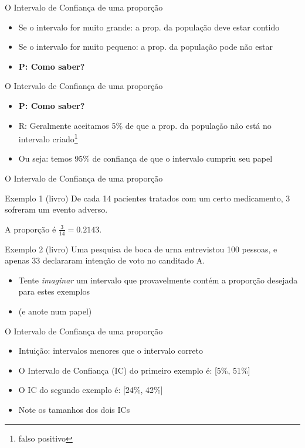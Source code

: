 \documentclass{beamer}
\begin{document}
\begin{frame}{O Intervalo de Confiança de uma proporção}
  \begin{itemize}
  \item Se o intervalo for muito grande: a prop. da população deve estar contido
  \item Se o intervalo for muito pequeno: a prop. da população pode não estar
  \item {\bf P: Como saber?}
  \end{itemize}
\end{frame}

\begin{frame}{O Intervalo de Confiança de uma proporção}
  \begin{itemize}
  \item {\bf P: Como saber?}
  \item R: Geralmente aceitamos 5\% de que a prop. da população não está no intervalo criado\footnote{\scriptsize falso positivo}
  \item Ou seja: temos \alert{95\% de confiança} de que o intervalo cumpriu seu papel
  \end{itemize}
\end{frame}

\begin{frame}{O Intervalo de Confiança de uma proporção}
  \begin{exampleblock}{Exemplo 1 (livro)}
    De cada 14 pacientes tratados com um certo medicamento, 3 sofreram um evento adverso.

    A proporção é $\frac{3}{14} = 0.2143$.
  \end{exampleblock}
    \begin{exampleblock}{Exemplo 2 (livro)}
    Uma pesquisa de boca de urna entrevistou 100 pessoas, e apenas 33 declararam intenção de voto no canditado A.

  \end{exampleblock}
  \begin{itemize}
    \item Tente {\em imaginar} um intervalo que \alert{provavelmente contém} a proporção desejada para estes exemplos
    \item (e anote num papel)
  \end{itemize}
\end{frame}

\begin{frame}{O Intervalo de Confiança de uma proporção}
  \begin{itemize}
  \item Intuição: intervalos menores que o intervalo correto
  \item O \alert{Intervalo de Confiança} (IC) do primeiro exemplo é: [5\%, 51\%]
  \item O IC do segundo exemplo é: [24\%, 42\%]
  \item<2-> Note os tamanhos dos dois ICs
  \end{itemize}
\end{frame}
\end{document}
